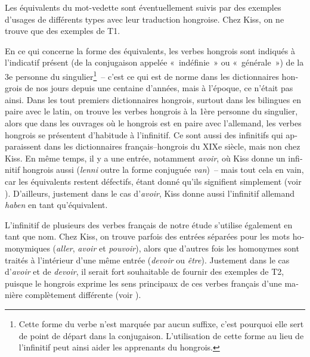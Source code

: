 \documentclass[output=paper,colorlinks,citecolor=brown,arabicfont,chinesefont,booklanguage=french]{langscibook}
\begin{document}
\begin{otherlanguage}{french}
Les équivalents du mot-vedette sont éventuellement suivis par des exemples d’usages de différents types avec leur traduction hongroise. Chez Kiss, on ne trouve que des exemples de T1. 

En ce qui concerne la forme des équivalents, les verbes hongrois sont indiqués à l’indicatif présent (de la conjugaison appelée «~indéfinie~» ou «~générale~») de la 3e personne du singulier\footnote{Cette forme du verbe n’est marquée par aucun suffixe, c’est pourquoi elle sert de point de départ dans la conjugaison. L’utilisation de cette forme au lieu de l’infinitif peut ainsi aider les apprenants du hongrois.}~-- c’est ce qui est de norme dans les dictionnaires hongrois de nos jours depuis une centaine d’années, mais à l’époque, ce n’était pas ainsi. Dans les tout premiers dictionnaires hongrois, surtout dans les bilingues en paire avec le latin, on trouve les verbes hongrois à la 1ère personne du singulier, alors que dans les ouvrages où le hongrois est en paire avec l’allemand, les verbes hongrois se présentent d’habitude à l’infinitif. Ce sont aussi des infinitifs qui apparaissent dans les dictionnaires français–hongrois du XIXe siècle, mais non chez Kiss. En même temps, il y a une entrée, notamment \emph{avoir}, où Kiss donne un infinitif hongrois aussi (\emph{lenni} outre la forme conjuguée \emph{van})~-- mais tout cela en vain, car les équivalents restent défectifs, étant donné qu’ils signifient simplement  (voir ). D’ailleurs, justement dans le cas d’\emph{avoir}, Kiss donne aussi l’infinitif allemand \emph{haben} en tant qu’équivalent.

L’infinitif de plusieurs des verbes français de notre étude s’utilise également en tant que nom. Chez Kiss, on trouve parfois des entrées séparées pour les mots homonymiques (\emph{aller}, \emph{avoir} et \emph{pouvoir}), alors que d’autres fois les homonymes sont traités à l’intérieur d’une même entrée (\emph{devoir} ou \emph{être}). Justement dans le cas d’\emph{avoir} et de \emph{devoir}, il serait fort souhaitable de fournir des exemples de T2, puisque le hongrois exprime les sens principaux de ces verbes français d’une manière complètement différente (voir ).


\end{otherlanguage}
\end{document}
